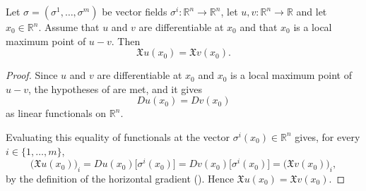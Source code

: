 \begin{lemma}
Let $\sigma=(\sigma^1,\dots,\sigma^m)$ be vector fields $\sigma^i:\mathbb{R}^n\to\mathbb{R}^n$, let
$u,v:\mathbb{R}^n\to\mathbb{R}$ and let $x_0\in\mathbb{R}^n$. Assume that $u$ and $v$ are
differentiable at $x_0$ and that $x_0$ is a local maximum point of $u-v$. Then
$$\mathfrak{X}u(x_0)=\mathfrak{X}v(x_0).$$
\end{lemma}
\begin{proof}
Since $u$ and $v$ are differentiable at $x_0$ and $x_0$ is a local maximum point of $u-v$, the
hypotheses of  are met, and it gives
$$Du(x_0)=Dv(x_0)$$
as linear functionals on $\mathbb{R}^n$.

Evaluating this equality of functionals at the vector $\sigma^i(x_0)\in\mathbb{R}^n$ gives, for
every $i\in\{1,\dots,m\}$,
$$\big(\mathfrak{X}u(x_0)\big)_i=Du(x_0)\big[\sigma^i(x_0)\big]
=Dv(x_0)\big[\sigma^i(x_0)\big]=\big(\mathfrak{X}v(x_0)\big)_i,$$
by the definition of the horizontal gradient (). Hence
$\mathfrak{X}u(x_0)=\mathfrak{X}v(x_0)$.
\end{proof}
